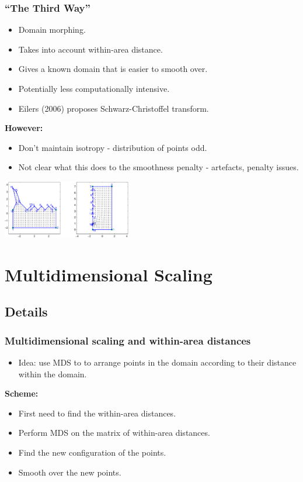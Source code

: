 \documentclass[ignorenonframetext]{beamer} %
\newcommand{\bc}{\begin{center}}
\newcommand{\ec}{\end{center}}
\newcommand{\bi}{\begin{itemize}}
\newcommand{\ei}{\end{itemize}}
\begin{document}
\begin{frame}
	\frametitle{``The Third Way''}
      \bi
         \item Domain morphing.
         \item Takes into account within-area distance.
         \item Gives a known domain that is easier to smooth over.
         \item Potentially less computationally intensive. 
         \item Eilers (2006) proposes Schwarz-Christoffel transform.
      \ei
      \bc
         \textbf{However:}
      \ec
      \bi
         \item Don't maintain isotropy - distribution of points odd.
         \item Not clear what this does to the smoothness penalty - artefacts, penalty issues.
      \ei
      \bc
         \includegraphics[height=1in]{figs/matlab-test-3}
      \ec
\end{frame}



\section{Multidimensional Scaling}

\subsection{Details}

\begin{frame}
	\frametitle{Multidimensional scaling and within-area distances}
       \bi
         \item Idea: use MDS to to arrange points in the domain according to their distance within the domain.
         \ei
         \bc \textbf{Scheme:} \ec
         \bi
         \item First need to find the within-area distances.
         \item Perform MDS on the matrix of within-area distances.
         \item Find the new configuration of the points.
         \item Smooth over the new points.

        \ei
\end{frame}
\end{document}
